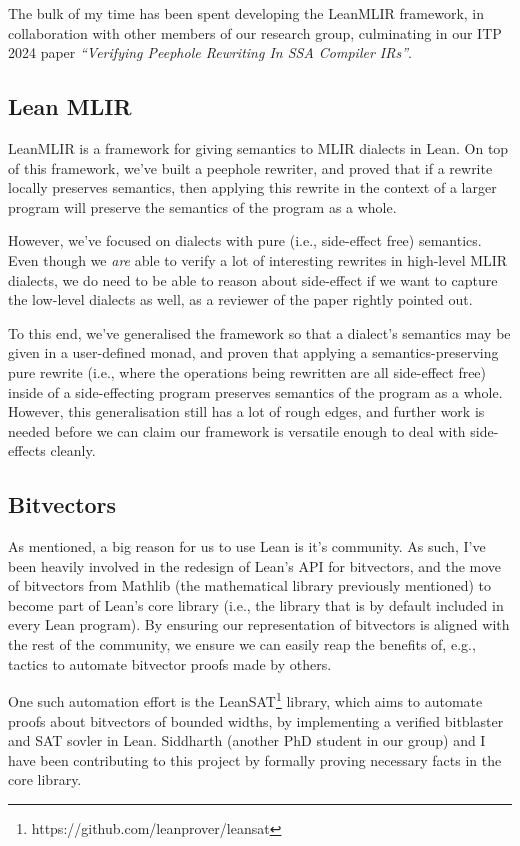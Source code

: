\documentclass[a4paper]{scrartcl}
\begin{document}
The bulk of my time has been spent developing the LeanMLIR framework, 
in collaboration with other members of our research group, 
culminating in our ITP 2024 paper \emph{``Verifying Peephole Rewriting In SSA
Compiler IRs''}.


\subsection{Lean MLIR}\label{lean-mlir}

LeanMLIR is a framework for giving semantics to MLIR dialects in Lean.
On top of this framework, we've built a peephole rewriter, and proved
that if a rewrite locally preserves semantics, then applying this
rewrite in the context of a larger program will preserve the semantics
of the program as a whole.

However, we've focused on dialects with pure (i.e., side-effect free)
semantics. Even though we \emph{are} able to verify a lot of interesting
rewrites in high-level MLIR dialects, we do need to be able to reason
about side-effect if we want to capture the low-level dialects as well,
as a reviewer of the paper rightly pointed out.

To this end, we've generalised the framework so that a dialect's
semantics may be given in a user-defined monad, and proven that applying
a semantics-preserving pure rewrite (i.e., where the operations being
rewritten are all side-effect free) inside of a side-effecting program
preserves semantics of the program as a whole. However, this
generalisation still has a lot of rough edges, and further work is
needed before we can claim our framework is versatile enough to deal
with side-effects cleanly.


\subsection{Bitvectors}\label{bitvectors}

As mentioned, a big reason for us to use Lean is it's community. As
such, I've been heavily involved in the redesign of Lean's API for
bitvectors, and the move of bitvectors from Mathlib (the mathematical
library previously mentioned) to become part of Lean's core library
(i.e., the library that is by default included in every Lean program).
By ensuring our representation of bitvectors is aligned with the rest of
the community, we ensure we can easily reap the benefits of, e.g.,
tactics to automate bitvector proofs made by others.

One such automation effort is the LeanSAT\footnote{https://github.com/leanprover/leansat}
library, which aims to automate proofs about bitvectors of bounded
widths, by implementing a verified bitblaster and SAT sovler in Lean.
Siddharth (another PhD student in our group) and I have been
contributing to this project by formally proving necessary facts in the
core library.
\end{document}

